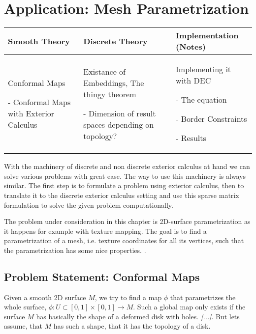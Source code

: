 \chapter{Application: Mesh Parametrization}
	\begin{longtable}{|p{4.5cm}|p{4.5cm}|p{4.5cm}|}
		\hline
		Smooth Theory& Discrete Theory& Implementation (Notes)\\
		\hline
			Conformal Maps
			\begin{packed_enum}
				\item[-] Conformal Maps with Exterior Calculus
			\end{packed_enum}
			&
			Existance of Embeddings, The thingy theorem
			\begin{packed_enum}
				\item[-] Dimension of result spaces depending on topology?
			\end{packed_enum}
			 & 
			 Implementing it with DEC
			 \begin{packed_enum}
				\item[-] The equation
				\item[-] Border Constraints
				\item[-] Results
			\end{packed_enum}
			 \\		
		\hline
	\end{longtable}
	
With the machinery of discrete and non discrete exterior calculus at hand we can solve various problems with great ease. The way to use this machinery is always similar. The first step is to formulate a problem using exterior calculus, then to translate it to the discrete exterior calculus setting and use this sparse matrix formulation to solve the given problem computationally.

The problem under consideration in this chapter is 2D-surface parametrization as it happens for example with texture mapping. The goal is to find a parametrization of a mesh, i.e. texture coordinates for all its vertices, such that the parametrization has some nice properties.  . 


	\section{Problem Statement: Conformal Maps}
	Given a smooth 2D surface $M$, we try to find a map $\phi$ that parametrizes the whole surface, $\phi: U \subset [0,1]\times [0,1] \rightarrow M$. Such a global map only exists if the surface $M$ has basically the shape of a deformed disk with holes. \emph{[...]}. But lets assume, that $M$ has such a shape, that it has the topology of a disk.
	
